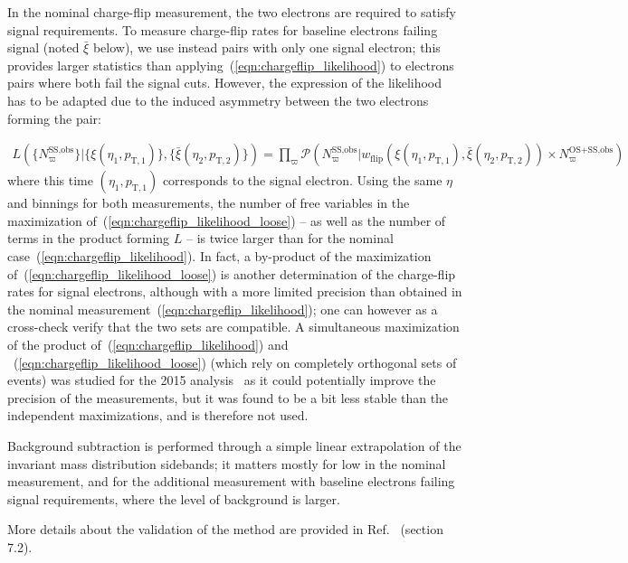 In the nominal charge-flip measurement, the two electrons are required to satisfy signal requirements. 
To measure charge-flip rates for baseline electrons failing signal (noted $\bar\xi$ below), 
we use instead pairs with only one signal electron; 
this provides larger statistics than applying~(\ref{eqn:chargeflip_likelihood}) to electrons pairs where both fail the signal cuts. 
However, the expression of the likelihood has to be adapted due to the induced asymmetry between the two electrons forming the pair: 

\begin{align}
L(\{N^\text{SS,obs}_\varpi\}|\{\xi(\eta_1,p_{\mathrm{T},1})\},\{\bar\xi(\eta_2,p_{\mathrm{T},2})\}) 
= \prod_{\varpi} \mathcal P\left(N^\text{SS,obs}_\varpi|w_\text{flip}(\xi(\eta_1,p_{\mathrm{T},1}),\bar\xi(\eta_2,p_{\mathrm{T},2}))\times N^\text{OS+SS,obs}_\varpi\right)
\label{eqn:chargeflip_likelihood_loose}
\end{align}
where this time $(\eta_1,p_{\mathrm{T},1})$ corresponds to the signal electron. 
Using the same $\eta$ and \pt binnings for both measurements, 
the number of free variables in the maximization of~(\ref{eqn:chargeflip_likelihood_loose}) 
-- as well as the number of terms in the product forming $L$ -- 
is twice larger than for the nominal case~(\ref{eqn:chargeflip_likelihood}). 
In fact, a by-product of the maximization of~(\ref{eqn:chargeflip_likelihood_loose}) is another determination of the charge-flip rates for signal electrons, 
although with a more limited precision than obtained in the nominal measurement~(\ref{eqn:chargeflip_likelihood}); 
one can however as a cross-check verify that the two sets are compatible. 
A simultaneous maximization of the product of~(\ref{eqn:chargeflip_likelihood}) and ~(\ref{eqn:chargeflip_likelihood_loose}) 
(which rely on completely orthogonal sets of events) was studied for the 2015 analysis~\cite{Abbott:2052581} 
as it could potentially improve the precision of the measurements, 
but it was found to be a bit less stable than the independent maximizations, and is therefore not used. 

Background subtraction is performed through a simple linear extrapolation of the invariant mass distribution sidebands; 
it matters mostly for low \pt in the nominal measurement, 
and for the additional measurement with baseline electrons failing signal requirements, where the level of background is larger. 

More details about the validation of the method are provided in Ref.~\cite{Abbott:2052581} (section 7.2). 

